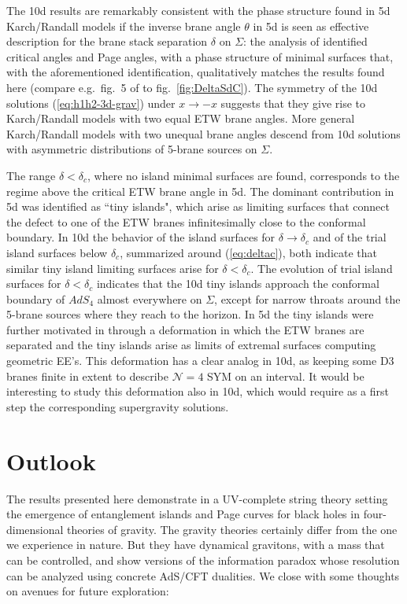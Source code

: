 \documentclass[aps,prd,11pt,notitlepage,longbibliography,nofootinbib,tightenlines,preprintnumbers]{revtex4-1}
\begin{document}
The 10d results are remarkably consistent with the phase structure found in 5d Karch/Randall models  if the inverse brane angle $\theta$ in 5d is seen as effective description for the brane stack separation $\delta$ on $\Sigma$:
the analysis of \cite{Geng:2020fxl} identified critical angles and Page angles, with a phase structure of minimal surfaces that, with the aforementioned identification, qualitatively matches the results found here (compare e.g.\ fig.~5 of \cite{Geng:2020fxl} to fig.~\ref{fig:DeltaSdC}). 
The symmetry of the 10d solutions (\ref{eq:h1h2-3d-grav}) under $x\rightarrow -x$ suggests that they give rise to Karch/Randall models with two equal ETW brane angles. 
More general Karch/Randall models with two unequal brane angles descend from 10d solutions with asymmetric distributions of 5-brane sources on $\Sigma$.

The range $\delta<\delta_c$, where no island minimal surfaces are found, corresponds to the regime above the critical ETW brane angle in 5d. The dominant contribution in 5d was identified as ``tiny islands", which arise as limiting surfaces that connect the defect to one of the ETW branes infinitesimally close to the conformal boundary.
%
In 10d the behavior of the island surfaces for  $\delta\rightarrow\delta_c$ and of the trial island surfaces below $\delta_c$, summarized around (\ref{eq:deltac}), both indicate that similar tiny island limiting surfaces arise for $\delta<\delta_c$.
The evolution of trial island surfaces for $\delta<\delta_c$ indicates that the 10d tiny islands approach the conformal boundary of $AdS_4$ almost everywhere on $\Sigma$, except for narrow throats around the 5-brane sources where they reach to the horizon.
In 5d the tiny islands were further motivated in \cite{Geng:2020fxl} through a deformation in which the ETW branes are separated and the tiny islands arise as limits of extremal surfaces computing geometric EE's.
This deformation has a clear analog in 10d, as keeping some D3 branes finite in extent to describe $\mathcal N=4$ SYM on an interval.
It would be interesting to study this deformation also in 10d, which would require as a first step the corresponding supergravity solutions.




\section{Outlook}\label{sec:outlook}

The results presented here  demonstrate in a UV-complete string theory setting the emergence of entanglement islands and Page curves for black holes in four-dimensional theories of gravity. 
The gravity theories certainly differ from the one we experience in nature. 
But they have dynamical gravitons, with a mass that can be controlled, and show versions of the information paradox whose resolution can be analyzed using concrete AdS/CFT dualities. We close with some thoughts on avenues for future exploration:
\end{document}
